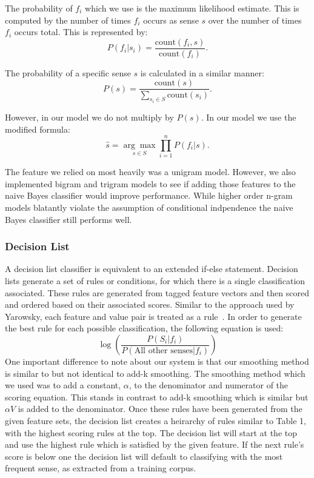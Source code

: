 \documentclass[11pt]{article}
\newcommand{\cou}{\textrm{count}}
\begin{document}
The probability of ${f_i}$ which we use is the maximum likelihood estimate. This is computed by the number of times $f_i$ occurs as sense $s$ over the number of times $f_i$ occurs total. 
This is represented by:
\[P(f_i|s_i) = \frac{\cou(f_i,s)}{\cou(f_i)}.\]

The probability of a specific sense $s$ is calculated in a similar manner:
$$P(s) = \frac{\cou(s)}{\underset{s_i \in S}{\sum} \cou(s_i)}.$$

However, in our model we do not multiply by $P(s)$. In our model we use the modified formula:
\[\hat{s} = \underset{s \in S}{\arg\max}{{\prod_{i=1}^n}P(f_i|s)}.\]

The feature we relied on most heavily was a unigram model. However, we also implemented bigram and trigram models to see if adding those features to the naive Bayes classifier would improve performance. While higher order n-gram models blatantly violate the assumption of conditional indpendence the naive Bayes classifier still performs well.

\subsubsection*{Decision List}
A decision list classifier is equivalent to an extended if-else statement. Decision lists generate a set of rules or conditions, for which there is a single classification associated. These rules are generated from tagged feature vectors and then scored and ordered based on their associated scores. Similar to the approach used by Yarowsky, each feature and value pair is treated as a rule~\cite{yarowsky1994decision}. In order to generate the best rule for each possible classification, the following equation is used:
\[ \log\left({\frac{P(S_i|f_i)}{P(\text{All other senses}|f_i)}}\right) \]
\indent One important difference to note about our system is that our smoothing method is similar to but not identical to add-k smoothing. The smoothing method which we used was to add a constant, $\alpha$, to the denominator and numerator of the scoring equation. This stands in contrast to add-k smoothing which is similar but $\alpha V$ is added to the denominator. Once these rules have been generated from the given feature sets, the decision list creates a heirarchy of rules similar to Table 1, with the highest scoring rules at the top. The decision list will start at the top and use the highest rule which is satisfied by the given feature. If the next rule's score is below one the decision list will default to classifying with the most frequent sense, as extracted from a training corpus.
\end{document}
